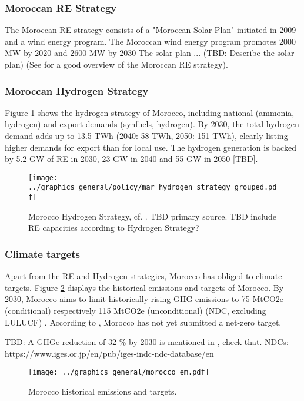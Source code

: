 \subsubsection{Moroccan RE Strategy}
The Moroccan RE strategy consists of a "Moroccan Solar Plan" initiated in 2009 \cite[p. 2]{Boulakhbar2020}
and a wind energy program.
The Moroccan wind energy program promotes 2000 MW by 2020 and 2600 MW by 2030 \cite[p. 4]{Boulakhbar2020}
The solar plan ... (TBD: Describe the solar plan)
(See \cite[p. 13]{Ersoy2022} for a good overview of the Moroccan RE strategy).

\subsubsection{Moroccan Hydrogen Strategy}
Figure \ref{fig:mar_hydrogen_strategy} shows the hydrogen strategy of Morocco, including
national (ammonia, hydrogen) and export demands (synfuels, hydrogen).
By 2030, the total hydrogen demand adds up to 13.5 TWh (2040: 58 TWh, 2050: 151 TWh), 
clearly listing higher demands for export than for local use. The hydrogen generation is backed by 5.2 GW of RE in 2030, 23 GW in 2040 and 55 GW in 2050 [TBD].


\begin{figure}
    \centering
    \texttt{[image: ../graphics\_general/policy/mar\_hydrogen\_strategy\_grouped.pdf]}
    \caption{Morocco Hydrogen Strategy, cf. \cite[p. 14]{Ersoy2022}. TBD primary source. TBD include RE capacities according to Hydrogen Strategy?}
    \label{fig:mar_hydrogen_strategy}
\end{figure}

\subsubsection{Climate targets}
Apart from the RE and Hydrogen strategies, Morocco has obliged to climate targets.
Figure \ref{fig:morocco_em} displays the historical emissions and targets of Morocco.
By 2030, Morocco aims to limit historically rising GHG emissions to 75 MtCO2e (conditional) 
respectively 115 MtCO2e (unconditional) (NDC, excluding LULUCF) \cite{CAT2021}. 
According to \cite{CAT2021}, Morocco has not yet submitted a net-zero target.

TBD: A GHGe reduction of 32 \% by 2030 is mentioned in \cite[5]{Boulakhbar2020}, check that.
NDCs: https://www.iges.or.jp/en/pub/iges-indc-ndc-database/en 


\begin{figure}[h!]
    \centering
    \texttt{[image: ../graphics\_general/morocco\_em.pdf]}
    \caption{Morocco historical emissions and targets.}
    \label{fig:morocco_em}
\end{figure}